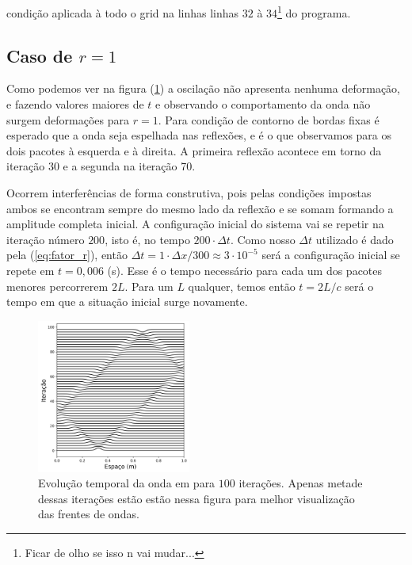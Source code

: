 \documentclass[a4paper, 11pt]{article}
\begin{document}
condição aplicada à todo o grid na linhas linhas $32$ à $34$\footnote{Ficar de olho se isso n vai mudar...} do programa.

\clearpage
\subsection{Caso de \( r = 1 \) }

Como podemos ver na figura (\ref{fig:tarefa1-a}) a oscilação não apresenta nenhuma deformação, e
fazendo valores maiores de \( t \) e observando o comportamento da onda não surgem deformações para
\( r = 1 \). Para condição de contorno de bordas fixas é esperado que a onda seja espelhada nas
reflexões, e é o que observamos para os dois pacotes à esquerda e à direita. A primeira reflexão
acontece em torno da iteração 30  e a segunda na iteração 70.

Ocorrem interferências de forma construtiva, pois pelas condições impostas ambos se encontram sempre
do mesmo lado da reflexão e se somam formando a amplitude completa inicial.
A configuração inicial do sistema vai se repetir na iteração número $200$, isto é, no tempo
\( 200 \cdot \Delta t \). Como nosso \( \Delta t\) utilizado é dado pela (\ref{eq:fator_r}), então \( \Delta t = 1 \cdot
\Delta x / 300  \approx 3 \cdot 10^{-5} \) será a configuração inicial se repete em \( t = 0,006 \) (s). Esse
é o tempo necessário para cada um dos pacotes menores percorrerem \( 2 L\). Para um \( L \)
qualquer, temos então \( t = 2 L / c \) será o tempo em que a situação inicial surge novamente.


\begin{figure}[h!] 
    \centering
    \centering
    \includegraphics[width=0.45\textwidth]{graf-tarefa1-a}
    \caption{Evolução temporal da onda em para $100$ iterações. Apenas metade dessas iterações estão
      estão nessa figura para melhor visualização das frentes de ondas.}
    \label{fig:tarefa1-a}
\end{figure}
\end{document}

